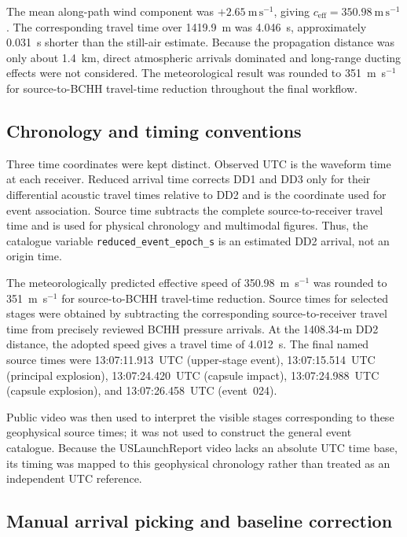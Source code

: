 \documentclass[]{seismica}
\begin{document}
The mean along-path wind component was $+2.65~\mathrm{m\,s^{-1}}$, giving
$c_{\mathrm{eff}}=350.98~\mathrm{m\,s^{-1}}$. The corresponding travel time
over 1419.9~m was 4.046~s, approximately 0.031~s shorter than the still-air
estimate. Because the propagation distance was only about 1.4~km, direct
atmospheric arrivals dominated and long-range ducting effects were not
considered. The meteorological result was rounded to 351~m~s$^{-1}$ for
source-to-BCHH travel-time reduction throughout the final workflow.

\subsection{Chronology and timing conventions}
\label{sec:methods_chronology}

Three time coordinates were kept distinct. Observed UTC is the waveform time at
each receiver. Reduced arrival time corrects DD1 and DD3 only for their
differential acoustic travel times relative to DD2 and is the coordinate used
for event association. Source time subtracts the complete source-to-receiver
travel time and is used for physical chronology and multimodal figures. Thus,
the catalogue variable \texttt{reduced\_event\_epoch\_s} is an estimated DD2
arrival, not an origin time.

The meteorologically predicted effective speed of 350.98~m~s$^{-1}$ was
rounded to 351~m~s$^{-1}$ for source-to-BCHH travel-time reduction. Source
times for selected stages were obtained by subtracting the corresponding
source-to-receiver travel time from precisely reviewed BCHH pressure arrivals.
At the 1408.34-m DD2 distance, the adopted speed gives a travel time of
4.012~s. The final named source times were 13:07:11.913~UTC (upper-stage event),
13:07:15.514~UTC (principal explosion), 13:07:24.420~UTC (capsule impact),
13:07:24.988~UTC (capsule explosion), and 13:07:26.458~UTC (event~024).

Public video was then used to interpret the visible stages corresponding to
these geophysical source times; it was not used to construct the general event
catalogue. Because the USLaunchReport video lacks an absolute UTC time base,
its timing was mapped to this geophysical chronology rather than treated as an
independent UTC reference.

\subsection{Manual arrival picking and baseline correction}
\end{document}
